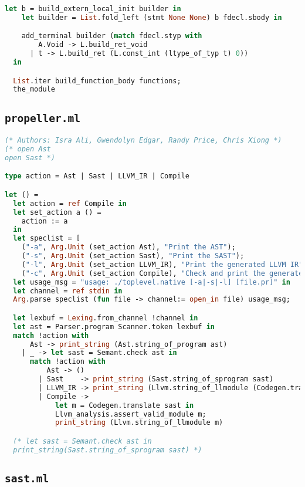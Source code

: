 \begin{lstlisting}[language=Caml,backgroundcolor=\color{backgroundcolor}]
    let b = build_extern_local_init builder in
    let builder = List.fold_left (stmt None None) b fdecl.sbody in

    add_terminal builder (match fdecl.styp with
        A.Void -> L.build_ret_void
      | t -> L.build_ret (L.const_int (ltype_of_typ t) 0))
  in

  List.iter build_function_body functions;
  the_module
\end{lstlisting}

\subsection{\texttt{propeller.ml}}

\begin{lstlisting}[language=Caml,backgroundcolor=\color{backgroundcolor}]
(* Authors: Isra Ali, Gwendolyn Edgar, Randy Price, Chris Xiong *)
(* open Ast
open Sast *)

type action = Ast | Sast | LLVM_IR | Compile

let () =
  let action = ref Compile in
  let set_action a () =
    action := a
  in
  let speclist = [
    ("-a", Arg.Unit (set_action Ast), "Print the AST");
    ("-s", Arg.Unit (set_action Sast), "Print the SAST");
    ("-l", Arg.Unit (set_action LLVM_IR), "Print the generated LLVM IR");
    ("-c", Arg.Unit (set_action Compile), "Check and print the generated LLVM IR (default)");] in
  let usage_msg = "usage: ./toplevel.native [-a|-s|-l] [file.pr]" in
  let channel = ref stdin in
  Arg.parse speclist (fun file -> channel:= open_in file) usage_msg;

  let lexbuf = Lexing.from_channel !channel in
  let ast = Parser.program Scanner.token lexbuf in
  match !action with
      Ast -> print_string (Ast.string_of_program ast)
    | _ -> let sast = Semant.check ast in
      match !action with
          Ast -> ()
        | Sast    -> print_string (Sast.string_of_sprogram sast)
        | LLVM_IR -> print_string (Llvm.string_of_llmodule (Codegen.translate sast))
        | Compile ->
            let m = Codegen.translate sast in
            Llvm_analysis.assert_valid_module m;
            print_string (Llvm.string_of_llmodule m)

  (* let sast = Semant.check ast in
  print_string(Sast.string_of_sprogram sast) *)
\end{lstlisting}

\subsection{\texttt{sast.ml}}

